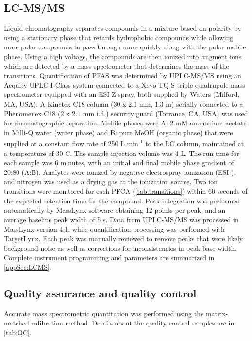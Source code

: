 \subsection{LC-MS/MS}
Liquid chromatography separates compounds in a mixture based on polarity by using a stationary phase that retards hydrophobic compounds while allowing more polar compounds to pass through more quickly along with the polar mobile phase. Using a high voltage, the compounds are then ionized into fragment ions which are detected by a mass spectrometer that determines the mass of the transitions. Quantification of PFAS was determined by UPLC-MS/MS using an Acquity UPLC I-Class system connected to a Xevo TQ-S triple quadrupole mass spectrometer equipped with an ESI Z spray, both supplied by Waters (Milford, MA, USA). A Kinetex C18 column (30 x 2.1 mm, 1.3 \textmu m) serially connected to a Phenomenex C18 (2 x 2.1 mm i.d.) security guard (Torrance, CA, USA) was used for chromatographic separation. Mobile phases were A: 2 mM ammonium acetate in Milli-Q water (water phase) and B: pure MeOH (organic phase) that were supplied at a constant flow rate of 250 \textmu L min\textsuperscript{-1} to the LC column, maintained at a temperature of 30 \textdegree C. The sample injection volume was 4 \textmu L. The run time for each sample was 6 minutes, with an initial and final mobile phase gradient of 20:80 (A:B). Analytes were ionized by negative electrospray ionization (ESI-), and nitrogen was used as a drying gas at the ionization source. Two ion transitions were monitored for each PFCA (\cref{tab:transitions}) within 60 seconds of the expected retention time for the compound. Peak integration was performed automatically by MassLynx software obtaining 12 points per peak, and an average baseline peak width of 5 s. Data from UPLC-MS/MS was processed in MassLynx version 4.1, while quantification processing was performed with TargetLynx. Each peak was manually reviewed to remove peaks that were likely background noise as well as corrections for inconsistencies in peak base width. Complete instrument programming and parameters are summarized in \cref{appSec:LCMS}.



\subsection{Quality assurance and quality control}
Accurate mass spectrometric quantitation was performed using the matrix-matched calibration method. Details about the quality control samples are in \cref{tab:QC}.

